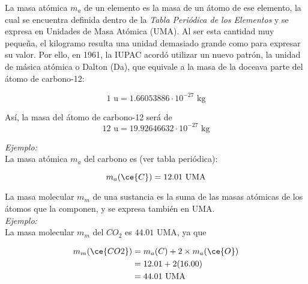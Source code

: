 \begin{warncard}[adjusted title={Masa atómica y masa molecular}]
    La masa atómica $m_a$ de un elemento es la masa de un átomo de ese elemento, la cual se encuentra definida dentro de la \emph{Tabla Periódica de los Elementos} y se expresa en Unidades de Masa Atómica (UMA).
    Al ser esta cantidad muy pequeña, el kilogramo resulta una unidad demasiado grande como para expresar su valor. Por ello, en 1961, la IUPAC acordó utilizar un nuevo patrón, la unidad de másica atómica o Dalton (Da), que equivale a la masa de la doceava parte del átomo de carbono-12:

    \[ 1 \text{ u} = 1.66053886\cdot 10^{-27} \text{ kg}\]

    Así, la masa del átomo de carbono-12 será de
    \[12 \text{ u} = 19.92646632\cdot 10^{-27} \text{ kg}\]

    \emph{Ejemplo:} \\
    La masa atómica $m_a$ del carbono es (ver tabla periódica):

    \[m_a(\ce{C})=12.01 \text{ UMA}\]

    \tcblower

    La masa molecular $m_m$ de una sustancia es la suma de las masas atómicas de los átomos que la componen, y se expresa también en UMA.\\

    \emph{Ejemplo:} \\
    La masa molecular $m_m$ del $CO_2$ es $44.01$ UMA, ya que

    \begin{align*}
        m_m(\ce{CO2}) & = m_a(C) + 2 \times m_a(\ce{O}) \\
                      & = 12.01 + 2(16.00)              \\
                      & = 44.01 \text{ UMA}
    \end{align*}
\end{warncard}